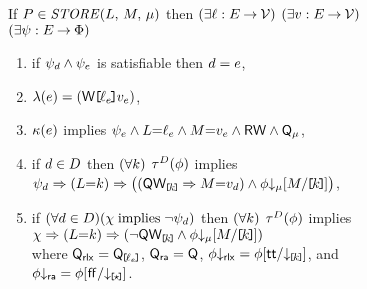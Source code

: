 \begin{figure*}
  \begin{center}
  \begin{minipage}{1.0\textwidth}
  \noindent
  If $\aPS \in \sSTORE[\amode]{\cExp}{\aExp}$ then
  $(\exists\cVal:\aEvs\fun\Val)$
  $(\exists\aVal:\aEvs\fun\Val)$
  $(\exists\bForm:\aEvs\fun\Formulae)$
  \begin{enumerate}
  \item if $\bForm_\bEv\land\bForm_\aEv$ is satisfiable then $\bEv=\aEv$,
  \item $\labelingAct(\aEv) = \DWREFP{\cVal_\aEv}{\aVal_\aEv}$,
  \item 
    $\labelingForm(\aEv)$ implies
    \begin{math}
      \bForm_\aEv
      \land \cExp{=}\cVal_\aEv
      \land \aExp{=}\aVal_\aEv
      \land \RW
      \land \Qmode{\amode}
    \end{math},
  \item if
    $\bEv\in\bEvs$
    then
    \begin{math}
      (\forall\dVal)
    \end{math}
    $\aTr[\bEvs](\aForm)$ implies 
    \begin{math}
      \bForm_\bEv
      \limplies (\cExp{=}\dVal)
      \limplies \PBRbig{
        (\QwREF{\dVal} \limplies \aExp{=}\aVal_\bEv)
        \land \aForm \Dmode{\amode}[\aExp/\REF{\dVal}]
      }
    \end{math},
  \item if 
    \begin{math}
      (\forall\bEv\in\bEvs)(\cForm \textimplies
      \lnot\bForm_\bEv)
    \end{math}
    then
    \begin{math}
      (\forall\dVal)
    \end{math}
    $\aTr[\bEvs](\aForm)$ implies 
    \begin{math}
      \cForm
      \limplies (\cExp{=}\dVal)
      \limplies \PBR{
        \lnot\QwREF{\dVal}
        \land \aForm \Dmode{\amode}[\aExp/\REF{\dVal}]
      }
    \end{math}
    \\ where $\Qmode{\mRLX}=\QxREF{\cVal_\aEv}$, $\Qmode{\mRA}=\Q$, %
      $\aForm\Dmode{\mRLX}=\aForm[\TRUE/\DxREF{\dVal}]$, and
      $\aForm\Dmode{\mRA}=\aForm[\FALSE/\DREF]$. %
  \end{enumerate}

\end{minipage}
\end{center}
\end{figure*}
